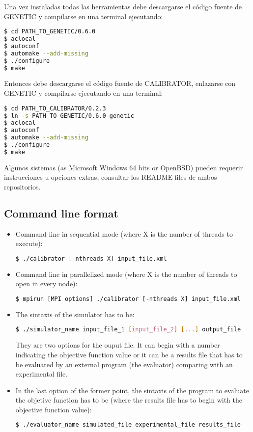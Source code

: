 \documentclass[review,authoryear]{elsarticle}
\begin{document}
Una vez instaladas todas las herramientas debe descargarse el código fuente de
GENETIC y compilarse en una terminal ejecutando:
\begin{lstlisting}[language=bash,basicstyle=\scriptsize]
$ cd PATH_TO_GENETIC/0.6.0
$ aclocal
$ autoconf
$ automake --add-missing
$ ./configure
$ make
\end{lstlisting}

Entonces debe descargarse el código fuente de CALIBRATOR, enlazarse con GENETIC
y compilarse ejecutando en una terminal:
\begin{lstlisting}[language=bash,basicstyle=\scriptsize]
$ cd PATH_TO_CALIBRATOR/0.2.3
$ ln -s PATH_TO_GENETIC/0.6.0 genetic
$ aclocal
$ autoconf
$ automake --add-missing
$ ./configure
$ make
\end{lstlisting}

Algunos sistemas (as Microsoft Windows 64 bits or OpenBSD) pueden requerir
instrucciones u opciones extras, consultar los README files de ambos
repositorios.

\subsection{Command line format}

\begin{itemize}

\item Command line in sequential mode (where X is the number of threads to
execute):
\begin{lstlisting}[language=bash,basicstyle=\scriptsize]
$ ./calibrator [-nthreads X] input_file.xml
\end{lstlisting}

\item Command line in parallelized mode (where X is the number of threads to
open in every node):
\begin{lstlisting}[language=bash,basicstyle=\scriptsize]
$ mpirun [MPI options] ./calibrator [-nthreads X] input_file.xml
\end{lstlisting}

\item The sintaxis of the simulator has to be:
\begin{lstlisting}[language=bash,basicstyle=\scriptsize]
$ ./simulator_name input_file_1 [input_file_2] [...] output_file
\end{lstlisting}
They are two options for the ouput file. It can begin with a number indicating
the objective function value or it can be a results file that has to be
evaluated by an external program (the evaluator) comparing with an experimental
file.

\item In the last option of the former point, the sintaxis of the program to
evaluate the objetive function has to be (where the results file has to begin
with the objective function value):
\begin{lstlisting}[language=bash,basicstyle=\scriptsize]
$ ./evaluator_name simulated_file experimental_file results_file
\end{lstlisting}

\end{itemize}
\end{document}

